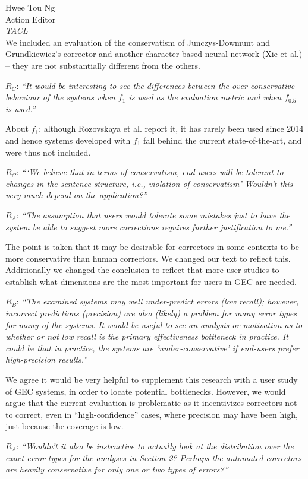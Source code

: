 \documentclass[11pt,letterpaper]{letter}
\begin{document}
\begin{letter}{%
Hwee Tou Ng\\
Action Editor\\
{\em TACL}\\
}
We included an evaluation of the conservatism of Junczys-Dowmunt and Grundkiewicz's corrector  and another character-based neural network (Xie et al.) -- they are not substantially different from the others.

$R_C$: \emph{``It would be interesting to see the differences between the over-conservative
	behaviour of the systems when $f_1$ is used as the evaluation metric and when
	$f_{0.5}$ is used.''}

About $f_1$: although Rozovskaya et al. report it, it has rarely been used since 2014 and hence systems developed with $f_1$ fall behind the current state-of-the-art, and were thus not included.
	
$R_C$: \emph{```We believe that in terms of conservatism, end users will be tolerant to
	changes in the sentence structure, i.e., violation of conservatism' Wouldn't
	this very much depend on the application?''
}

$R_A$: \emph{``The assumption that users would tolerate
	some mistakes just to have the system be able to suggest more corrections
	requires further justification to me.''
}
	
The point is taken that it may be desirable for correctors in some contexts to be more conservative than human correctors. We changed our text to reflect this. Additionally we changed the conclusion to reflect that more user studies to establish what dimensions are the most important for users in GEC are needed.

$R_B$: \emph{``The examined systems may well under-predict errors (low recall); however,
	incorrect predictions (precision) are also (likely) a problem for many error
	types for many of the systems. It would be useful to see an analysis or
	motivation as to whether or not low recall is the primary effectiveness
	bottleneck in practice. It could be that in practice, the systems are
	'under-conservative' if end-users prefer high-precision results.''
	}

We agree it would be very helpful to supplement this research with a user study of GEC systems, in order to locate potential bottlenecks. However, we would argue that the current evaluation is problematic as it incentivizes correctors not to correct, even in ``high-confidence'' cases, where precision may have been high, just because the coverage is low. 

$R_A$: \emph{``Wouldn't it also be instructive to actually look at the distribution
	over the exact error types for the analyses in Section 2? Perhaps the automated correctors are heavily conservative for only one or two types of errors?''
	}
	

\end{letter}
\end{document}
